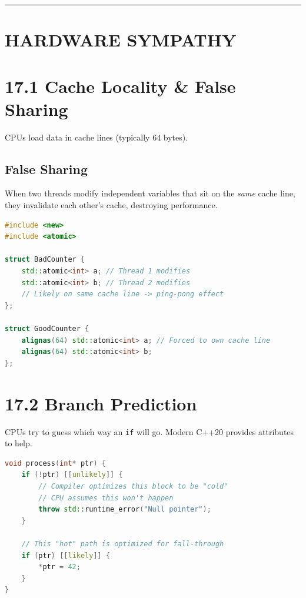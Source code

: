 \begin{center}\rule{0.5\linewidth}{0.5pt}\end{center}

\hypertarget{hardware-sympathy}{%
\section{HARDWARE SYMPATHY}\label{hardware-sympathy}}

\hypertarget{cache-locality-false-sharing}{%
\section{17.1 Cache Locality \& False
Sharing}\label{cache-locality-false-sharing}}

CPUs load data in cache lines (typically 64 bytes).

\hypertarget{false-sharing}{%
\subsection{False Sharing}\label{false-sharing}}

When two threads modify independent variables that sit on the
\emph{same} cache line, they invalidate each other's cache, destroying
performance.

\begin{lstlisting}[language={C++}]
#include <new>
#include <atomic>

struct BadCounter {
    std::atomic<int> a; // Thread 1 modifies
    std::atomic<int> b; // Thread 2 modifies
    // Likely on same cache line -> ping-pong effect
};

struct GoodCounter {
    alignas(64) std::atomic<int> a; // Forced to own cache line
    alignas(64) std::atomic<int> b;
};
\end{lstlisting}

\hypertarget{branch-prediction}{%
\section{17.2 Branch Prediction}\label{branch-prediction}}

CPUs try to guess which way an \passthrough{\lstinline!if!} will go.
Modern C++20 provides attributes to help.

\begin{lstlisting}[language={C++}]
void process(int* ptr) {
    if (!ptr) [[unlikely]] {
        // Compiler optimizes this block to be "cold"
        // CPU assumes this won't happen
        throw std::runtime_error("Null pointer");
    }
    
    // This "hot" path is optimized for fall-through
    if (ptr) [[likely]] {
        *ptr = 42;
    }
}
\end{lstlisting}

